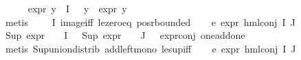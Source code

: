 \begin{isabellebody}
\ \ \ \ \isamarkupfalse%
\ expr{\isacharunderscore}{\kern0pt}{\isasymphi}\ {\isacartoucheopen}{\isacharparenleft}{\kern0pt}{\isasymforall}y{\isasymin}{\isasymPhi}\ {\isacharbackquote}{\kern0pt}\ I{\isachardot}{\kern0pt}\ {\isasymphi}\ {\isasymnoteq}\ y\ {\isasymlongrightarrow}\ expr{\isacharunderscore}{\kern0pt}{}\ y\ {\isacharequal}{\kern0pt}\ {}{\isacharparenright}{\kern0pt}{\isacartoucheclose}\ \isanewline
\ \ \ \ \isamarkupfalse%
\ {\isacharparenleft}{\kern0pt}metis\ {\isacartoucheopen}{\isasymphi}\ {\isasymin}\ {\isasymPhi}\ {\isacharbackquote}{\kern0pt}\ I{\isacartoucheclose}\ image{\isacharunderscore}{\kern0pt}iff\ le{\isacharunderscore}{\kern0pt}zero{\isacharunderscore}{\kern0pt}eq\ pos{\isacharunderscore}{\kern0pt}r{\isacharunderscore}{\kern0pt}bounded{\isacharparenright}{\kern0pt}\isanewline
\ \ \isamarkupfalse%
\ e{}{\isacharcolon}{\kern0pt}\ {\isachardoublequoteopen}expr{\isacharunderscore}{\kern0pt}{}\ {\isacharparenleft}{\kern0pt}hml{\isacharunderscore}{\kern0pt}conj\ I\ J\ {\isasymPhi}{\isacharparenright}{\kern0pt}\ {\isasymle}\ {}{\isachardoublequoteclose}\isanewline
\ \ \ \ \isamarkupfalse%
\ {\isacartoucheopen}Sup\ {\isacharparenleft}{\kern0pt}{\isacharparenleft}{\kern0pt}expr{\isacharunderscore}{\kern0pt}{}\ {\isasymcirc}\ {\isasymPhi}{\isacharparenright}{\kern0pt}\ {\isacharbackquote}{\kern0pt}\ I{\isacharparenright}{\kern0pt}\ {\isasymle}\ {}{\isacartoucheclose}\ {\isacartoucheopen}Sup\ {\isacharparenleft}{\kern0pt}{\isacharparenleft}{\kern0pt}expr{\isacharunderscore}{\kern0pt}{}\ {\isasymcirc}\ {\isasymPhi}{\isacharparenright}{\kern0pt}\ {\isacharbackquote}{\kern0pt}\ J{\isacharparenright}{\kern0pt}\ {\isasymle}\ {}{\isacartoucheclose}\ expr{\isacharunderscore}{\kern0pt}{}{\isacharunderscore}{\kern0pt}conj\ one{\isacharunderscore}{\kern0pt}add{\isacharunderscore}{\kern0pt}one\isanewline
\ \ \ \ \isamarkupfalse%
\ {\isacharparenleft}{\kern0pt}metis\ Sup{\isacharunderscore}{\kern0pt}union{\isacharunderscore}{\kern0pt}distrib\ add{\isacharunderscore}{\kern0pt}left{\isacharunderscore}{\kern0pt}mono\ le{\isacharunderscore}{\kern0pt}sup{\isacharunderscore}{\kern0pt}iff{\isacharparenright}{\kern0pt}\isanewline
\ \ \isamarkupfalse%
\ e{}{\isacharcolon}{\kern0pt}\ {\isachardoublequoteopen}expr{\isacharunderscore}{\kern0pt}{}\ {\isacharparenleft}{\kern0pt}hml{\isacharunderscore}{\kern0pt}conj\ I\ J\ {\isasymPhi}{\isacharparenright}{\kern0pt}\ {\isasymle}\ {}{\isachardoublequoteclose}\isanewline

\end{isabellebody}

